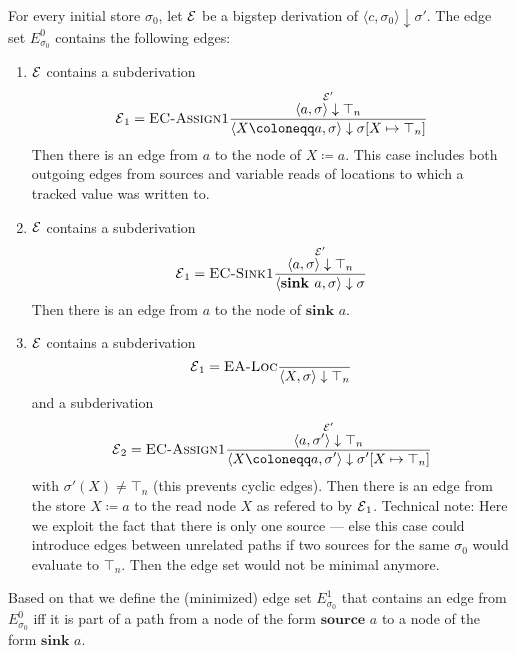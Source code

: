 For every initial store $\sigma_0$, 
let $\operatorname{\mathcal{E}}$ be a bigstep derivation of $\langle c, \sigma_0 \rangle \downarrow \sigma'$.
The edge set $E^0_{\sigma_0}$ contains the following edges:
\begin{enumerate}
    \item $\operatorname{\mathcal{E}}$ contains a subderivation
    \begin{equation*}
        \E_1 = \textsc{EC-Assign1}\ddfrac{\overset{\E'}{\langle a, \sigma \rangle \downarrow \top_n}}
        {\langle X \coloneqq a, \sigma \rangle \downarrow
         \sigma[X \mapsto \top_n]}
    \end{equation*}
    Then there is an edge from $a$ to the node of $X \coloneqq a$.
    This case includes both outgoing edges from sources and variable reads
    of locations to which a tracked value was written to.
    \item $\operatorname{\mathcal{E}}$ contains a subderivation
    \begin{equation*}
        \operatorname{\mathcal{E}}_1 = \textsc{EC-Sink1}\frac{\displaystyle \overset{\operatorname{\mathcal{E}}'}{\langle a, \sigma \rangle \downarrow \top_n}}{\displaystyle \langle \textbf{sink }a, \sigma \rangle \downarrow
         \sigma}
    \end{equation*}
    Then there is an edge from $a$ to the node of $\textbf{sink }a$.
    \item
    $\operatorname{\mathcal{E}}$ contains a subderivation
    \begin{equation*}
        \operatorname{\mathcal{E}}_1 = \textsc{EA-Loc}\frac{\displaystyle }{\displaystyle \langle X, \sigma \rangle \downarrow \top_n}
    \end{equation*}
    and a subderivation
    \begin{equation*}
        \E_2 = \textsc{EC-Assign1}\ddfrac{\overset{\E'}{\langle a, \sigma' \rangle \downarrow \top_n}}
        {\langle X \coloneqq a, \sigma' \rangle \downarrow
         \sigma'[X \mapsto \top_n]}
    \end{equation*}
    with $\sigma'(X) \neq \top_n$ (this prevents cyclic edges).
    Then there is an edge from the store $X \coloneqq a$ to the read node $X$ as 
    refered to by $\operatorname{\mathcal{E}}_1$.
    Technical note: Here we exploit the fact that there is only one source ---
    else this case could introduce edges between unrelated paths if two sources for the same 
    $\sigma_0$ would evaluate to $\top_n$. Then the edge set would not be minimal
    anymore.
\end{enumerate}

Based on that we define the (minimized) edge set $E^1_{\sigma_0}$
that contains an edge from $E^0_{\sigma_0}$ iff it is part of a path 
from a node of the form $\textbf{source }a$
to a node of the form $\textbf{sink }a$.


